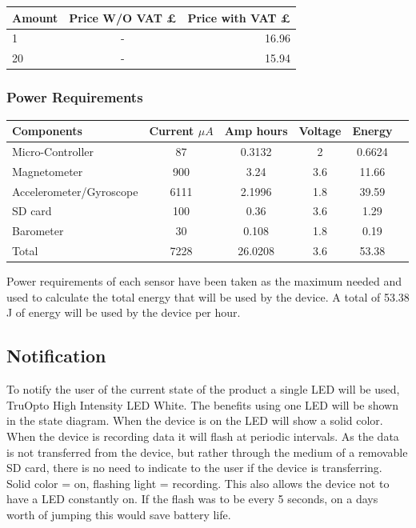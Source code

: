\documentclass{report}
\begin{document}
\begin{center}
  \begin{tabular}{ | l | c | r |}
    \hline
    Amount & Price W/O VAT £ & Price with VAT £ \\ \hline
    1 & - & 16.96 \\ \hline
    20 & - & 15.94 \\ \hline
	\end{tabular}
\end{center}

\subsubsection{Power Requirements} 
\begin{center}
\begin{tabular}{ | l | c | c | c | c | r |}
\hline
  Components&Current $\mu A$&Amp hours&Voltage&Energy\\ \hline
   Micro-Controller& 87 & 0.3132 & 2& 0.6624  \\ \hline
   Magnetometer& 900 & 3.24 & 3.6   &11.66  \\ \hline
   Accelerometer/Gyroscope&6111 & 2.1996 &1.8    &39.59 \\ \hline
   SD card& 100 &0.36  & 3.6   & 1.29   \\ \hline
   Barometer&30  &0.108  &  1.8 & 0.19 \\ \hline
   Total&7228 &26.0208  & 3.6  &53.38  \\ \hline
  	\end{tabular}
\end{center}

Power requirements of each sensor have been taken as the maximum needed and used to calculate the total energy that will be used by the device. A total of 53.38  J of energy will be used by the device per hour. 

\subsection{Notification}
To notify the user of the current state of the product a single LED will be used, TruOpto High Intensity LED White. The benefits using one LED will be shown in the state diagram. When the device is on the LED will show a solid color. When the device is recording data it will flash at periodic intervals. As the data is not transferred from the device, but rather through the medium of a removable SD card, there is no need to indicate to the user if the device is transferring. Solid color = on, flashing light = recording. 
This also allows the device not to have a LED constantly on. If the flash was to be every 5 seconds, on a days worth of jumping this would save battery life.
\end{document}
